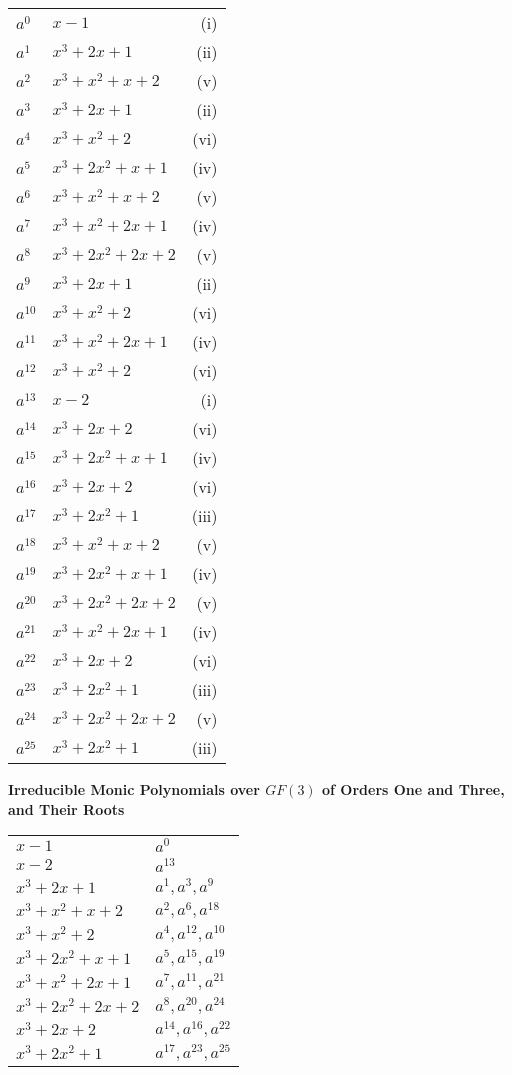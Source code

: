 \documentclass[11pt]{article} \usepackage{amssymb}
\begin{document}
\begin{enumerate}
\begin{enumerate}
\begin{tabular}{l| l r}
      $a^{0}$ & $x-1$ & (i)\\
      $a^{1}$ & $x^3+2x+1$ & (ii)\\
      $a^{2}$ & $x^3+x^2+x+2$ & (v)\\
      $a^{3}$ & $x^3+2x+1$ & (ii)\\
      $a^{4}$ & $x^3+x^2+2$ & (vi)\\
      $a^{5}$ & $x^3+2x^2+x+1$ & (iv)\\
      $a^{6}$ & $x^3+x^2+x+2$ & (v)\\
      $a^{7}$ & $x^3+x^2+2x+1$ & (iv)\\
      $a^{8}$ & $x^3+2x^2+2x+2$ & (v)\\
      $a^{9}$ & $x^3+2x+1$ & (ii)\\
      $a^{10}$ & $x^3+x^2+2$ & (vi)\\
      $a^{11}$ & $x^3+x^2+2x+1$ & (iv)\\
      $a^{12}$ & $x^3+x^2+2$ & (vi)\\
      $a^{13}$ & $x-2$ & (i)\\
      $a^{14}$ & $x^3+2x+2$ & (vi)\\
      $a^{15}$ & $x^3+2x^2+x+1$ & (iv)\\
      $a^{16}$ & $x^3+2x+2$ & (vi)\\
      $a^{17}$ & $x^3+2x^2+1$ & (iii)\\
      $a^{18}$ & $x^3+x^2+x+2$ & (v)\\
      $a^{19}$ & $x^3+2x^2+x+1$ & (iv)\\
      $a^{20}$ & $x^3+2x^2+2x+2$ & (v)\\
      $a^{21}$ & $x^3+x^2+2x+1$ & (iv)\\
      $a^{22}$ & $x^3+2x+2$ & (vi)\\
      $a^{23}$ & $x^3+2x^2+1$ & (iii)\\
      $a^{24}$ & $x^3+2x^2+2x+2$ & (v)\\
      $a^{25}$ & $x^3+2x^2+1$ & (iii)\\
    \end{tabular}

    {\bf Irreducible Monic Polynomials over $GF(3)$ of Orders One and Three, and
      Their Roots}

    \begin{tabular}{l| l }
      \label{table:polys}
      $x-1$ & $a^{0}$\\
      $x-2$ & $a^{13}$\\
      $x^3+2x+1$ & $a^{1}, a^3, a^9$\\
      $x^3+x^2+x+2$ & $a^{2},a^6,a^{18}$\\
      $x^3+x^2+2$ & $a^4, a^{12}, a^{10}$\\
      $x^3+2x^2+x+1$ & $a^5,a^{15}, a^{19}$\\
      $x^3+x^2+2x+1$ & $a^7,a^{11},a^{21}$\\
      $x^3+2x^2+2x+2$ & $a^{8},a^{20},a^{24}$\\
      $x^3+2x+2$ & $a^{14},a^{16},a^{22}$\\
      $x^3+2x^2+1$ & $a^{17},a^{23},a^{25}$\\
    \end{tabular}


\end{enumerate}
\end{enumerate}
\end{document}

